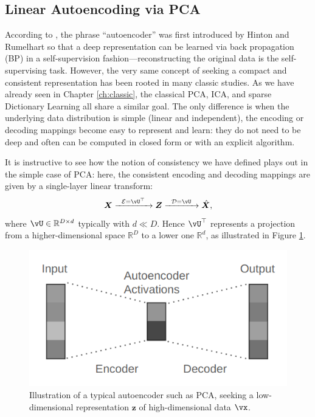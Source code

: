 \documentclass[../../book-main.tex]{subfiles}
\begin{document}

\subsection{Linear Autoencoding via PCA}
According to \cite{Baldi2011}, the phrase ``autoencoder'' was first
introduced by Hinton and Rumelhart \cite{Rumelhart1986} so that a
deep representation can be learned via back propagation (BP) in a self-supervision fashion---reconstructing the original data is the self-supervising task. However, the very same concept of seeking a compact and consistent representation has been rooted in many classic studies. As we have already seen in Chapter \ref{ch:classic}, the classical PCA, ICA, and sparse Dictionary Learning all share a similar goal. The only difference is when the underlying data distribution is simple (linear and
independent), the encoding or decoding mappings become easy to represent and
learn: they do not need to be deep and often can be computed in closed form or
with an explicit algorithm.

It is instructive to see how the notion of consistency we have
defined plays out in the simple case of PCA:
here, the consistent encoding and decoding mappings are given by a single-layer
linear transform:
\begin{equation}
  \X \xrightarrow{\hspace{2mm} \mathcal{E} = \vU^\top \hspace{2mm}}
  \Z \xrightarrow{\hspace{2mm} \mathcal{D} = \vU \hspace{2mm}}   \hat{\X},
  \label{eqn:autoencoding-PCA-2}
\end{equation}
where $\vU \in \mathbb{R}^{D\times d}$ typically with $d\ll D$. Hence
$\vU^\top $ represents a projection from a higher-dimensional space
$\mathbb{R}^{D}$  to a lower one $\mathbb{R}^{d}$, as illustrated in
Figure \ref{fig:AE}.
\begin{figure}
  \centering \includegraphics[width=0.5\linewidth]{chapters/chapter5/figs/autoencoder.png}
  \caption{Illustration of a typical autoencoder such as PCA, seeking
  a low-dimensional representation $\bm{z}$ of high-dimensional data $\vx$.}
  \label{fig:AE}
\end{figure}
\end{document}
